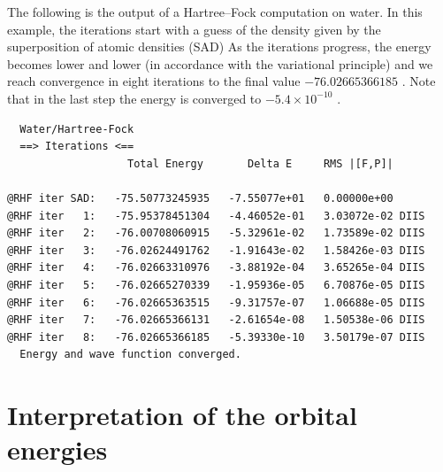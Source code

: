\documentclass[../Main/chem371-notes.tex]{subfiles}
\begin{document}
The following is the output of a Hartree--Fock computation on water.
In this example, the iterations start with a guess of the density given by the superposition of atomic densities (SAD)
As the iterations progress, the energy becomes lower and lower (in accordance with the variational principle) and we reach convergence in eight iterations to the final value $-76.02665366185$ \Eh.
Note that in the last step the energy is converged to $-5.4 \times 10^{-10}$ \Eh.
\begin{small}
\begin{verbatim}
  Water/Hartree-Fock
  ==> Iterations <==
                   Total Energy       Delta E     RMS |[F,P]|

@RHF iter SAD:   -75.50773245935   -7.55077e+01   0.00000e+00 
@RHF iter   1:   -75.95378451304   -4.46052e-01   3.03072e-02 DIIS
@RHF iter   2:   -76.00708060915   -5.32961e-02   1.73589e-02 DIIS
@RHF iter   3:   -76.02624491762   -1.91643e-02   1.58426e-03 DIIS
@RHF iter   4:   -76.02663310976   -3.88192e-04   3.65265e-04 DIIS
@RHF iter   5:   -76.02665270339   -1.95936e-05   6.70876e-05 DIIS
@RHF iter   6:   -76.02665363515   -9.31757e-07   1.06688e-05 DIIS
@RHF iter   7:   -76.02665366131   -2.61654e-08   1.50538e-06 DIIS
@RHF iter   8:   -76.02665366185   -5.39330e-10   3.50179e-07 DIIS
  Energy and wave function converged.
\end{verbatim}
\end{small}


\section{Interpretation of the orbital energies}
\end{document}
